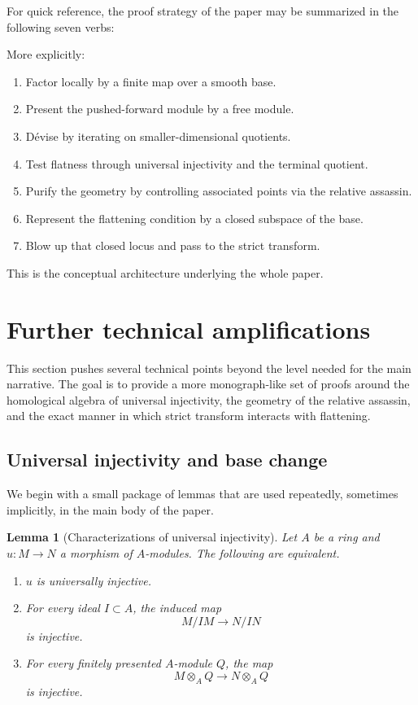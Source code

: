\documentclass[11pt,oneside]{article}
\newtheorem{lemma}[theorem]{Lemma}
\newcommand{\ot}{\otimes}
\begin{document}
For quick reference, the proof strategy of the paper may be summarized in the following seven verbs:
\begin{center}
\end{center}
More explicitly:
\begin{enumerate}[label=\textup{(\arabic*)}]
  \item Factor locally by a finite map over a smooth base.
  \item Present the pushed-forward module by a free module.
  \item D\'evise by iterating on smaller-dimensional quotients.
  \item Test flatness through universal injectivity and the terminal quotient.
  \item Purify the geometry by controlling associated points via the relative assassin.
  \item Represent the flattening condition by a closed subspace of the base.
  \item Blow up that closed locus and pass to the strict transform.
\end{enumerate}
This is the conceptual architecture underlying the whole paper.


\section{Further technical amplifications}

This section pushes several technical points beyond the level needed for the main narrative.  The goal is to provide a more monograph-like set of proofs around the homological algebra of universal injectivity, the geometry of the relative assassin, and the exact manner in which strict transform interacts with flattening.

\subsection{Universal injectivity and base change}

We begin with a small package of lemmas that are used repeatedly, sometimes implicitly, in the main body of the paper.

\begin{lemma}[Characterizations of universal injectivity]\label{lem:ui-char}
Let $A$ be a ring and $u\colon M\to N$ a morphism of $A$-modules.  The following are equivalent.
\begin{enumerate}[label=\textup{(\roman*)}]
  \item $u$ is universally injective.
  \item For every ideal $I\subset A$, the induced map
  \[
  M/IM\longrightarrow N/IN
  \]
  is injective.
  \item For every finitely presented $A$-module $Q$, the map
  \[
  M\ot_A Q\longrightarrow N\ot_A Q
  \]
  is injective.
\end{enumerate}
\end{lemma}
\end{document}
